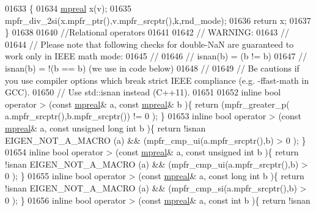 \begin{DoxyCode}
01633 \{
01634     \hyperlink{classmpfr_1_1mpreal}{mpreal} x(v);
01635     mpfr\_div\_2si(x.mpfr\_ptr(),v.mpfr\_srcptr(),k,rnd\_mode);
01636     \textcolor{keywordflow}{return} x;
01637 \}
01638 
01640 \textcolor{comment}{//Relational operators}
01641 
01642 \textcolor{comment}{// WARNING:}
01643 \textcolor{comment}{//}
01644 \textcolor{comment}{// Please note that following checks for double-NaN are guaranteed to work only in IEEE math mode:}
01645 \textcolor{comment}{//}
01646 \textcolor{comment}{// isnan(b) =  (b != b)}
01647 \textcolor{comment}{// isnan(b) = !(b == b)  (we use in code below)}
01648 \textcolor{comment}{//}
01649 \textcolor{comment}{// Be cautions if you use compiler options which break strict IEEE compliance (e.g. -ffast-math in GCC).}
01650 \textcolor{comment}{// Use std::isnan instead (C++11).}
01651 
01652 \textcolor{keyword}{inline} \textcolor{keywordtype}{bool} operator >  (\textcolor{keyword}{const} \hyperlink{classmpfr_1_1mpreal}{mpreal}& a, \textcolor{keyword}{const} \hyperlink{classmpfr_1_1mpreal}{mpreal}& b           )\{  \textcolor{keywordflow}{return} (mpfr\_greater\_p(
      a.mpfr\_srcptr(),b.mpfr\_srcptr()) != 0 );            \}
01653 \textcolor{keyword}{inline} \textcolor{keywordtype}{bool} operator >  (\textcolor{keyword}{const} \hyperlink{classmpfr_1_1mpreal}{mpreal}& a, \textcolor{keyword}{const} \textcolor{keywordtype}{unsigned} \textcolor{keywordtype}{long} \textcolor{keywordtype}{int} b )\{  \textcolor{keywordflow}{return} !isnan 
      EIGEN\_NOT\_A\_MACRO (a) && (mpfr\_cmp\_ui(a.mpfr\_srcptr(),b) > 0 );                 \}
01654 \textcolor{keyword}{inline} \textcolor{keywordtype}{bool} operator >  (\textcolor{keyword}{const} \hyperlink{classmpfr_1_1mpreal}{mpreal}& a, \textcolor{keyword}{const} \textcolor{keywordtype}{unsigned} \textcolor{keywordtype}{int} b      )\{  \textcolor{keywordflow}{return} !isnan 
      EIGEN\_NOT\_A\_MACRO (a) && (mpfr\_cmp\_ui(a.mpfr\_srcptr(),b) > 0 );                 \}
01655 \textcolor{keyword}{inline} \textcolor{keywordtype}{bool} operator >  (\textcolor{keyword}{const} \hyperlink{classmpfr_1_1mpreal}{mpreal}& a, \textcolor{keyword}{const} \textcolor{keywordtype}{long} \textcolor{keywordtype}{int} b          )\{  \textcolor{keywordflow}{return} !isnan 
      EIGEN\_NOT\_A\_MACRO (a) && (mpfr\_cmp\_si(a.mpfr\_srcptr(),b) > 0 );                 \}
01656 \textcolor{keyword}{inline} \textcolor{keywordtype}{bool} operator >  (\textcolor{keyword}{const} \hyperlink{classmpfr_1_1mpreal}{mpreal}& a, \textcolor{keyword}{const} \textcolor{keywordtype}{int} b               )\{  \textcolor{keywordflow}{return} !isnan 

\end{DoxyCode}
